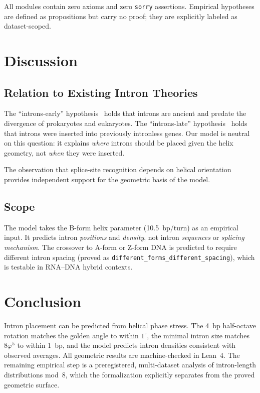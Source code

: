 \documentclass[11pt,twocolumn]{article}
\begin{document}
All modules contain zero axioms and zero \texttt{sorry} assertions.
Empirical hypotheses are defined as propositions but carry no proof; they
are explicitly labeled as dataset-scoped.

\section{Discussion}

\subsection{Relation to Existing Intron Theories}

The ``introns-early'' hypothesis~\cite{Gilbert1978} holds that introns are
ancient and predate the divergence of prokaryotes and eukaryotes. The
``introns-late'' hypothesis~\cite{Cavalier1991} holds that introns were
inserted into previously intronless genes. Our model is neutral on this
question: it explains \emph{where} introns should be placed given the
helix geometry, not \emph{when} they were inserted.

The observation that splice-site recognition depends on helical
orientation~\cite{Lim2001} provides independent support for the geometric
basis of the model.

\subsection{Scope}

The model takes the B-form helix parameter (10.5~bp/turn) as an empirical
input. It predicts intron \emph{positions} and \emph{density}, not intron
\emph{sequences} or \emph{splicing mechanism}. The crossover to A-form or
Z-form DNA is predicted to require different intron spacing (proved as
\texttt{different\_forms\_different\_spacing}), which is testable in
RNA--DNA hybrid contexts.

\section{Conclusion}

Intron placement can be predicted from helical phase stress. The 4~bp
half-octave rotation matches the golden angle to within $1^\circ$, the
minimal intron size matches $8\varphi^5$ to within 1~bp, and the model
predicts intron densities consistent with observed averages. All geometric
results are machine-checked in Lean~4. The remaining empirical step is a
preregistered, multi-dataset analysis of intron-length distributions
mod~8, which the formalization explicitly separates from the proved
geometric surface.
\end{document}
